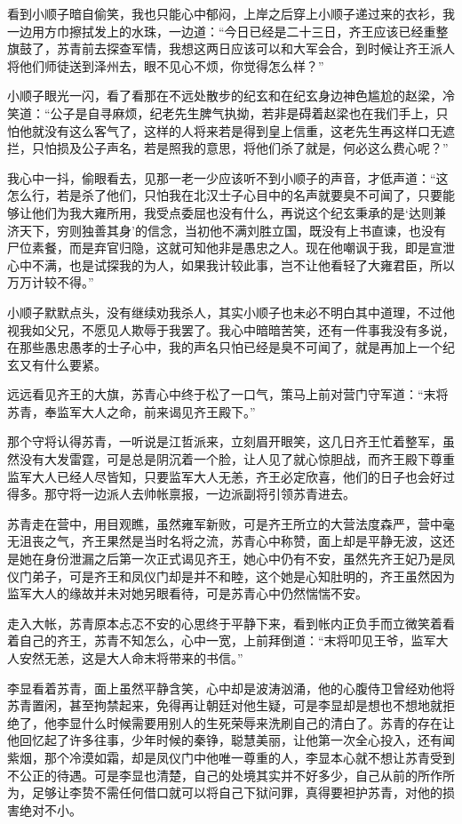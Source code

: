 看到小顺子暗自偷笑，我也只能心中郁闷，上岸之后穿上小顺子递过来的衣衫，我一边用方巾擦拭发上的水珠，一边道：“今日已经是二十三日，齐王应该已经重整旗鼓了，苏青前去探查军情，我想这两日应该可以和大军会合，到时候让齐王派人将他们师徒送到泽州去，眼不见心不烦，你觉得怎么样？”

小顺子眼光一闪，看了看那在不远处散步的纪玄和在纪玄身边神色尴尬的赵梁，冷笑道：“公子是自寻麻烦，纪老先生脾气执拗，若非是碍着赵梁也在我们手上，只怕他就没有这么客气了，这样的人将来若是得到皇上信重，这老先生再这样口无遮拦，只怕损及公子声名，若是照我的意思，将他们杀了就是，何必这么费心呢？”

我心中一抖，偷眼看去，见那一老一少应该听不到小顺子的声音，才低声道：“这怎么行，若是杀了他们，只怕我在北汉士子心目中的名声就要臭不可闻了，只要能够让他们为我大雍所用，我受点委屈也没有什么，再说这个纪玄秉承的是‘达则兼济天下，穷则独善其身’的信念，当初他不满刘胜立国，既没有上书直谏，也没有尸位素餐，而是弃官归隐，这就可知他非是愚忠之人。现在他嘲讽于我，即是宣泄心中不满，也是试探我的为人，如果我计较此事，岂不让他看轻了大雍君臣，所以万万计较不得。”

小顺子默默点头，没有继续劝我杀人，其实小顺子也未必不明白其中道理，不过他视我如父兄，不愿见人欺辱于我罢了。我心中暗暗苦笑，还有一件事我没有多说，在那些愚忠愚孝的士子心中，我的声名只怕已经是臭不可闻了，就是再加上一个纪玄又有什么要紧。

远远看见齐王的大旗，苏青心中终于松了一口气，策马上前对营门守军道：“末将苏青，奉监军大人之命，前来谒见齐王殿下。”

那个守将认得苏青，一听说是江哲派来，立刻眉开眼笑，这几日齐王忙着整军，虽然没有大发雷霆，可是总是阴沉着一个脸，让人见了就心惊胆战，而齐王殿下尊重监军大人已经人尽皆知，只要监军大人无恙，齐王必定欣喜，他们的日子也会好过得多。那守将一边派人去帅帐禀报，一边派副将引领苏青进去。

苏青走在营中，用目观瞧，虽然雍军新败，可是齐王所立的大营法度森严，营中毫无沮丧之气，齐王果然是当时名将之流，苏青心中称赞，面上却是平静无波，这还是她在身份泄漏之后第一次正式谒见齐王，她心中仍有不安，虽然先齐王妃乃是凤仪门弟子，可是齐王和凤仪门却是并不和睦，这个她是心知肚明的，齐王虽然因为监军大人的缘故并未对她另眼看待，可是苏青心中仍然惴惴不安。

走入大帐，苏青原本忐忑不安的心思终于平静下来，看到帐内正负手而立微笑着看着自己的齐王，苏青不知怎么，心中一宽，上前拜倒道：“末将叩见王爷，监军大人安然无恙，这是大人命末将带来的书信。”

李显看着苏青，面上虽然平静含笑，心中却是波涛汹涌，他的心腹侍卫曾经劝他将苏青置闲，甚至拘禁起来，免得再让朝廷对他生疑，可是李显却是想也不想地就拒绝了，他李显什么时候需要用别人的生死荣辱来洗刷自己的清白了。苏青的存在让他回忆起了许多往事，少年时候的秦铮，聪慧美丽，让他第一次全心投入，还有闻紫烟，那个冷漠如霜，却是凤仪门中他唯一尊重的人，李显本心就不想让苏青受到不公正的待遇。可是李显也清楚，自己的处境其实并不好多少，自己从前的所作所为，足够让李贽不需任何借口就可以将自己下狱问罪，真得要袒护苏青，对他的损害绝对不小。

